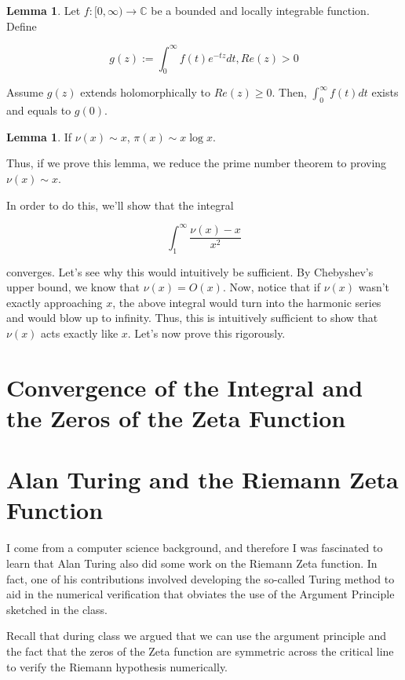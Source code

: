 \documentclass{article}
\theoremstyle{definition}
\newtheorem{lemma}[theorem]{Lemma}
\newcommand{\C}{\mathbb{C}}
\begin{document}
\begin{lemma}
    Let $ f:[0,\infty) \xrightarrow{} \C$ be a bounded and locally integrable function.
    Define 

    \[ g(z) := \int_{0}^{\infty} f(t) e^{-tz} dt, Re(z) > 0 \]

    Assume $ g(z) $ extends holomorphically to $ Re(z) \geq 0 $.
    Then, $ \int_{0}^{\infty} f(t) dt $ exists and equals to $ g(0) $.
\end{lemma}

\begin{lemma}
    If $ \nu(x) \sim x $, $ \pi(x) \sim x \log x $.
\end{lemma}

Thus, if we prove this lemma, we reduce the prime number theorem to proving $ \nu(x) \sim x $.

In order to do this, we'll show that the integral 

\[ \int_{1}^{\infty} \frac{\nu(x) - x}{x^{2}} \]

converges. Let's see why this would intuitively be sufficient. By Chebyshev's upper bound,
we know that $ \nu(x) = O(x) $. Now, notice that if $ \nu(x) $ wasn't exactly approaching $ x $,
the above integral would turn into the harmonic series and would blow up to infinity. Thus, this is intuitively
sufficient to show that $ \nu(x) $ acts exactly like $ x $. Let's now prove this rigorously.

\newpage



\section{Convergence of the Integral and the Zeros of the Zeta Function}



\newpage

\section{Alan Turing and the Riemann Zeta Function}

I come from a computer science background, and therefore I was fascinated to learn
that Alan Turing also did some work on the Riemann Zeta function. In fact, one of
his contributions involved developing the so-called Turing method to aid in the
numerical verification that obviates the use of the Argument Principle sketched in
the class.

Recall that during class we argued that we can use the argument principle and the fact
that the zeros of the Zeta function are symmetric across the critical line to verify
the Riemann hypothesis numerically.
\end{document}
